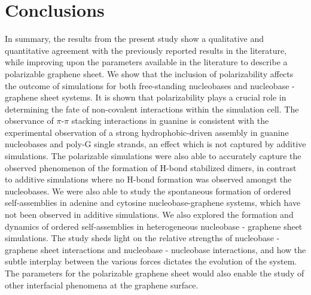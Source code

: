     \section{Conclusions}
    In summary, the results from the present study show a qualitative and quantitative agreement with the previously reported results in the literature, while improving upon the parameters available in the literature to describe a polarizable graphene sheet. We show that the inclusion of polarizability affects the outcome of simulations for both free-standing nucleobases and nucleobase - graphene sheet systems. It is shown that polarizability plays a crucial role in determining the fate of non-covalent interactions within the simulation cell. The observance of $\pi$-$\pi$ stacking interactions in guanine is consistent with the experimental observation of a strong hydrophobic-driven assembly in guanine nucleobases\supercite{varghese_binding_2009} and poly-G single strands,\supercite{akca_competing_2011} an effect which is not captured by additive simulations. The polarizable simulations were also able to accurately capture the observed phenomenon of the formation of H-bond stabilized dimers,\supercite{kelly_understanding_2008,lukas_adenine_2009,otero_elementary_2008,spada_guanosine-based_2008,xu_probing_2007} in contrast to additive simulations where no H-bond formation was observed amongst the nucleobases. We were also able to study the spontaneous formation of ordered self-assemblies in adenine and cytosine nucleobase-graphene systems, which have not been observed in additive simulations. We also explored the formation and dynamics of ordered self-assemblies in heterogeneous nucleobase - graphene sheet simulations. The study sheds light on the relative strengths of nucleobase - graphene sheet interactions and nucleobase - nucleobase interactions, and how the subtle interplay between the various forces dictates the evolution of the system. The parameters for the polarizable graphene sheet would also enable the study of other interfacial phenomena at the graphene surface.